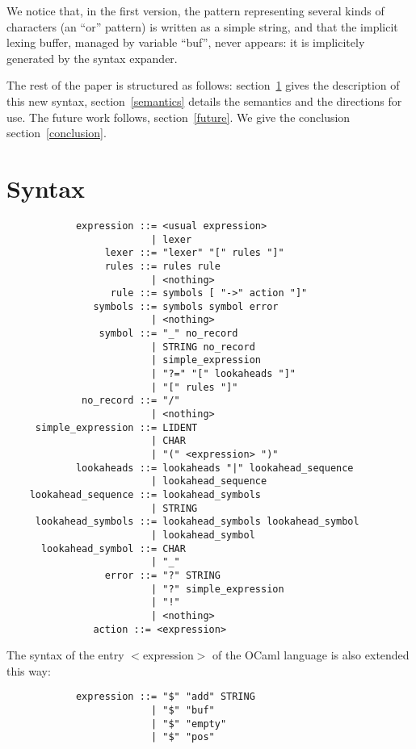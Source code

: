 \documentclass[11pt]{article}
\begin{document}
We notice that, in the first version, the pattern representing several
kinds of characters (an ``or'' pattern) is written as a simple string,
and that the implicit lexing buffer, managed by variable ``buf'',
never appears: it is implicitely generated by the syntax expander.

The rest of the paper is structured as follows: section~\ref{syntax}
gives the description of this new syntax, section~\ref{semantics}
details the semantics and the directions for use. The future work
follows, section~\ref{future}. We give the conclusion
section~\ref{conclusion}.

\section{Syntax}
\label{syntax}

\begin{verbatim}
            expression ::= <usual expression>
                         | lexer
                 lexer ::= "lexer" "[" rules "]"
                 rules ::= rules rule
                         | <nothing>
                  rule ::= symbols [ "->" action "]"
               symbols ::= symbols symbol error
                         | <nothing>
                symbol ::= "_" no_record
                         | STRING no_record
                         | simple_expression
                         | "?=" "[" lookaheads "]"
                         | "[" rules "]"
             no_record ::= "/"
                         | <nothing>
     simple_expression ::= LIDENT
                         | CHAR
                         | "(" <expression> ")"
            lookaheads ::= lookaheads "|" lookahead_sequence
                         | lookahead_sequence
    lookahead_sequence ::= lookahead_symbols
                         | STRING
     lookahead_symbols ::= lookahead_symbols lookahead_symbol
                         | lookahead_symbol
      lookahead_symbol ::= CHAR
                         | "_"
                 error ::= "?" STRING
                         | "?" simple_expression
                         | "!"
                         | <nothing>
               action ::= <expression>
\end{verbatim}

The syntax of the entry $<$expression$>$ of the OCaml language is also
extended this way:

\begin{verbatim}
            expression ::= "$" "add" STRING
                         | "$" "buf"
                         | "$" "empty"
                         | "$" "pos"
\end{verbatim}
\end{document}
